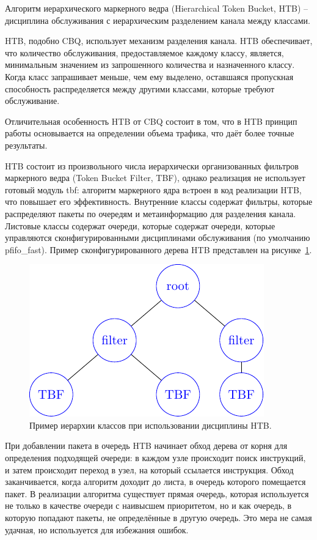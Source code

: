         Алгоритм иерархического маркерного ведра (Hierarchical Token Bucket, HTB) -- дисциплина
        обслуживания с иерархическим разделением канала между классами.

		HTB, подобно CBQ, использует механизм разделения канала. 
		HTB обеспечивает, что количество обслуживания, предоставляемое каждому классу, является,
		минимальным значением из запрошенного количества и назначенного классу. Когда класс
		запрашивает меньше, чем ему выделено, оставшаяся пропускная способность распределяется между
		другими классами, которые требуют обслуживание.\cite{htb}

		Отличительная особенность HTB от CBQ состоит в том, что в HTB принцип работы
		основывается на определении объема трафика\cite{lartc}, что даёт более точные результаты.

		HTB состоит из произвольного числа иерархически организованных фильтров
		маркерного ведра (Token Bucket Filter, TBF)\cite{packethandling},
		однако реализация не использует готовый
		модуль tbf: алгоритм маркерного ядра вcтроен в код реализации
		HTB, что повышает его эффективность. Внутренние классы содержат
		фильтры, которые распределяют пакеты по очередям и метаинформацию
		для разделения канала. Листовые
		классы содержат очереди, которые содержат очереди, которые
		управляются сконфигурированными дисциплинами обслуживания (по
		умолчанию pfifo\_fast). Пример сконфигурированного дерева
		HTB представлен на рисунке~\ref{pic:htb_hier}.
		
        \begin{figure}[ht!]
            \center
            \includegraphics[scale=1.4]{./pdfimages/class_hierh_htb.pdf}
            \caption{Пример иерархии классов при использовании дисциплины HTB.}
			\label{pic:htb_hier}
        \end{figure}

        При добавлении пакета в очередь HTB начинает обход дерева от корня
        для определения подходящей очереди: в каждом узле происходит поиск
        инструкций, и затем происходит переход в узел, на который ссылается
        инструкция. Обход заканчивается, когда алгоритм доходит до листа,
        в очередь которого помещается пакет.\cite{tchtb} В реализации алгоритма
		существует прямая очередь, которая используется не только в качестве
		очереди с наивысшем приоритетом, но и как очередь, в которую попадают
		пакеты, не определённые в другую очередь. Это мера не самая удачная,
		но используется для избежания ошибок.

